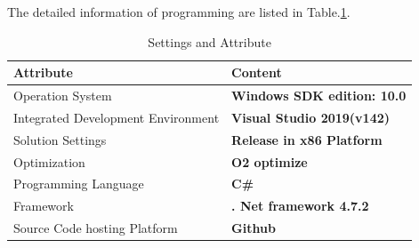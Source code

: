 The detailed information of programming are listed in Table.\ref{tab:environment}.
\begin{table}[!hpbt]
	\centering
	\begin{tabular}{ll}
	\hline
	\multicolumn{1}{|l|}{Attribute} & \multicolumn{1}{|l|}{Content}  \\ \hline
	\multicolumn{1}{|l|}{Operation System}                     & \multicolumn{1}{|l|}{\textbf{Windows SDK edition: 10.0}}  \\ \hline
	\multicolumn{1}{|l|}{Integrated Development Environment}      & \multicolumn{1}{|l|}{\textbf{Visual Studio 2019(v142)}}    \\ \hline
	\multicolumn{1}{|l|}{Solution Settings}                       & \multicolumn{1}{|l|}{\textbf{Release in x86 Platform}}\\\hline
	\multicolumn{1}{|l|}{Optimization}  & \multicolumn{1}{|l|}{\textbf{O2 optimize}} \\ \hline
	\multicolumn{1}{|l|}{Programming Language} & \multicolumn{1}{|l|}{\textbf{C\#}} \\ \hline
	\multicolumn{1}{|l|}{Framework} & \multicolumn{1}{|l|}{\textbf{. Net framework 4.7.2}}\\ \hline
	\multicolumn{1}{|l|}{Source Code hosting Platform} & \multicolumn{1}{|l|}{\textbf{Github}} \\ \hline
	\end{tabular}
	\caption{Settings and Attribute}
	\label{tab:environment}
\end{table}

